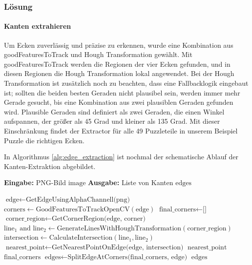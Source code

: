 \subsubsection{Lösung}
\paragraph{Kanten extrahieren}
Um Ecken zuverlässig und präzise zu erkennen, wurde eine Kombination aus goodFeaturesToTrack und Hough Transformation gewählt. Mit goodFeaturesToTrack werden die Regionen der vier Ecken gefunden, und in diesen Regionen die Hough Transformation lokal angewendet. Bei der Hough Transformation ist zusätzlich noch zu beachten, dass eine Fallbacklogik eingebaut ist; sollten die beiden besten Geraden nicht plausibel sein, werden immer mehr Gerade gesucht, bis eine Kombination aus zwei plausiblen Geraden gefunden wird. Plausible Geraden sind definiert als zwei Geraden, die einen Winkel aufspannen, der größer als 45 Grad und kleiner als 135 Grad. Mit dieser Einschränkung findet der Extractor für alle 49 Puzzleteile in unserem Beispiel Puzzle die richtigen Ecken.

In Algorithmus \ref{alg:edge_extraction} ist nochmal der schematische Ablauf der Kanten-Extraktion abgebildet.

\begin{algorithm}

\caption{Kantenextraktion aus einem PNG-Bild}\label{alg:edge_extraction}
\begin{algorithmic}[1]
\State \textbf{Eingabe:} PNG-Bild $\text{image}$
\State \textbf{Ausgabe:} Liste von Kanten $\text{edges}$

\State $\text{edge} \gets \text{GetEdgeUsingAlphaChannell(png)}$
\State $\text{corners} \gets \text{GoodFeaturesToTrackOpenCV}(\text{edge})$
\State $\text{final\_corners} \gets \text{[]}$
    \State $\text{corner\_region} \gets \text{GetCornerRegion(edge, corner)}$
    \State $\text{line}_1 \text{ and } \text{line}_2 \gets \text{GenerateLinesWithHoughTransformation}(\text{corner\_region})$
    \State $\text{intersection} \gets \text{CalculateIntersection}(\text{line}_1, \text{line}_2)$
    \State $\text{nearest\_point} \gets \text{GetNearestPointOnEdge(edge, intersection)}$
    \State {} $\text{nearest\_point}$  $\text{final\_corners}$ 
\EndFor
\State $\text{edges} \gets \text{SplitEdgeAtCorners(final\_corners, edge)}$
\State \Return $\text{edges}$
\end{algorithmic}

\end{algorithm}


